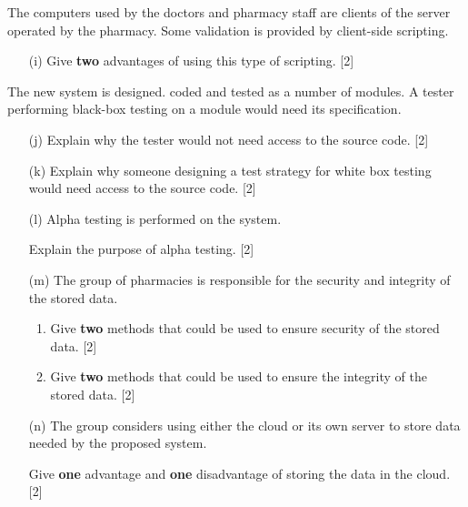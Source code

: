 The computers used by the doctors and pharmacy staff are clients of
the server operated by the pharmacy. Some validation is provided by
client-side scripting.
\begin{enumerate}
\item[(i)] Give \textbf{two} advantages of using this type of scripting. \hfill{}{[}2{]}
\end{enumerate}
The new system is designed. coded and tested as a number of modules.
A tester performing black-box testing on a module would need its specification. 
\begin{enumerate}
\item[(j)] Explain why the tester would not need access to the source code.
\hfill{}{[}2{]}
\item[(k)] Explain why someone designing a test strategy for white box testing
would need access to the source code. \hfill{}{[}2{]}
\item[(l)] Alpha testing is performed on the system. 

Explain the purpose of alpha testing. \hfill{} {[}2{]}
\item[(m)] The group of pharmacies is responsible for the security and integrity
of the stored data. 
\begin{enumerate}
\item Give \textbf{two }methods that could be used to ensure security of
the stored data. \hfill{}{[}2{]}
\item Give \textbf{two} methods that could be used to ensure the integrity
of the stored data. \hfill{}{[}2{]}
\end{enumerate}
\item[(n)] The group considers using either the cloud or its own server to store
data needed by the proposed system. 

Give \textbf{one} advantage and \textbf{one} disadvantage of storing
the data in the cloud. \hfill{}{[}2{]}
\end{enumerate}